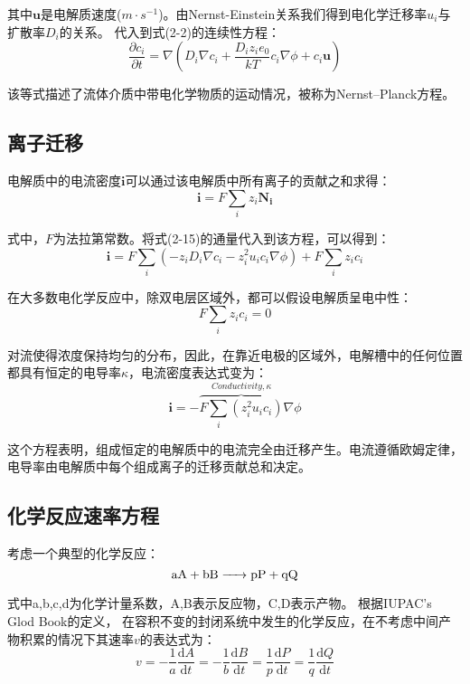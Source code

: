 其中$\mathbf{u}$是电解质速度($m\cdot{s^{-1}}$)。由Nernst-Einstein关系我们得到电化学迁移率$u_i$与扩散率$D_i$的关系。
代入到式(2-2)的连续性方程：
\begin{equation}
    \frac{\partial c_i}{\partial t}=\nabla{(D_i\nabla{c_i}+\frac{D_iz_ie_0}{kT}c_i\nabla\phi+c_i\mathbf{u})}
\end{equation}

该等式描述了流体介质中带电化学物质的运动情况，被称为Nernst–Planck方程。\cite{Mehrer2007}
\subsection{离子迁移}
电解质中的电流密度$\mathbf{i}$可以通过该电解质中所有离子的贡献之和求得：
\begin{equation}
    \mathbf{i}=F\sum_i{z_i\mathbf{N_i}}
\end{equation}

式中，$F$为法拉第常数。将式(2-15)的通量代入到该方程，可以得到：
\begin{equation}
    \mathbf{i}=F\sum_i(-z_iD_i\nabla{c_i}-z_i^2u_ic_i\nabla\phi)+F\sum_iz_ic_i
\end{equation}

在大多数电化学反应中，除双电层区域外，都可以假设电解质呈电中性：
\begin{equation}
    F\sum_iz_ic_i=0
\end{equation}

对流使得浓度保持均匀的分布，因此，在靠近电极的区域外，电解槽中的任何位置都具有恒定的电导率$\kappa$，电流密度表达式变为：
\begin{equation}
    \mathbf{i}=-\overbrace{F\sum_i(z_i^2u_ic_i)}^{Conductivity,\kappa}\nabla\phi
\end{equation}

这个方程表明，组成恒定的电解质中的电流完全由迁移产生。电流遵循欧姆定律，电导率由电解质中每个组成离子的迁移贡献总和决定。\cite{Smedley1980}
\subsection{化学反应速率方程}
考虑一个典型的化学反应：
\begin{equation}
    \ce{aA + bB -> pP + qQ}
\end{equation}

式中a,b,c,d为化学计量系数，A,B表示反应物，C,D表示产物。
根据IUPAC's Glod Book的定义\cite{GlossaryoftermsusedinphysicalorganicchemistryIUPACRecommendations1994}，
在容积不变的封闭系统中发生的化学反应，在不考虑中间产物积累的情况下其速率$v$的表达式为：
\begin{equation}
    v=-\frac{1}{a}\frac{\mathrm{d}A}{\mathrm{d}t}
    =-\frac{1}{b}\frac{\mathrm{d}B}{\mathrm{d}t}
    =\frac{1}{p}\frac{\mathrm{d}P}{\mathrm{d}t}
    =\frac{1}{q}\frac{\mathrm{d}Q}{\mathrm{d}t}
\end{equation}

